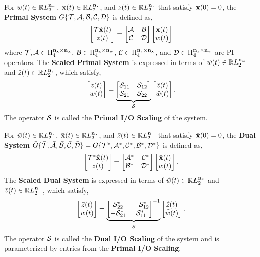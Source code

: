 
\begin{definition}\label{def:primalscaledsys}
	For $w(t)\in\mathbb{R} L_2^{\mathbf{n}_w}$, $\mathbf{x}(t)\in\mathbb{R} L_2^{\mathbf{n}_{\mathbf{x}}}$, and
	$z(t)\in\mathbb{R} L_2^{\mathbf{n}_z}$ that satisfy $\mathbf{x}(0) = 0$, the \textbf{Primal System}
	$G\{\mathcal{T}, \mathcal{A}, \mathcal{B}, \mathcal{C}, \mathcal{D}\}$ is defined as,
	\begin{equation}\label{eqn:primalsys}
		\begin{bmatrix}\mathcal{T}\dot{\mathbf{x}}(t)\\ z(t)\end{bmatrix} = \begin{bmatrix}\mathcal{A} & \mathcal{B} \\
			\mathcal{C} & \mathcal{D}\end{bmatrix}\begin{bmatrix}\mathbf{x}(t) \\ w(t)\end{bmatrix}
	\end{equation}
	where $\mathcal{T}, \mathcal{A}\in \Pi_4^{\mathbf{n}_{\mathbf{x}} \times \mathbf{n}_{\mathbf{x}}}$,
	$\mathcal{B}\in \Pi_4^{\mathbf{n}_{\mathbf{x}} \times \mathbf{n}_w}$,
	$\mathcal{C}\in\Pi_4^{\mathbf{n}_z\times\mathbf{n}_{\mathbf{x}}}$, and
	$\mathcal{D}\in\Pi_4^{\mathbf{n}_z \times \mathbf{n}_w}$ are PI operators.
	The \textbf{Scaled Primal System} is expressed in terms of $\tilde{w}(t)\in
		\mathbb{R} L_2^{\mathbf{n}_w}$ and $\tilde{z}(t)\in\mathbb{R} L_2^{\mathbf{n}_z}$, which satisfy,
	\begin{equation}\label{eqn:primalscaling}
		\begin{bmatrix}z(t) \\ w(t)\end{bmatrix} = \underbrace{\begin{bmatrix}\mathcal{S}_{11} & \mathcal{S}_{12} \\
				\mathcal{S}_{21} & \mathcal{S}_{22}\end{bmatrix}}_{\mathcal{S}}\begin{bmatrix}\tilde{z}(t) \\ \tilde{w}(t)\end{bmatrix}.
	\end{equation}
	The operator $\mathcal{S}$ is called the \textbf{Primal I/O Scaling} of the system.
\end{definition}

\begin{definition}\label{def:dualscaledsys}
	For $\bar{w}(t)\in\mathbb{R} L_2^{\mathbf{n}_z}$, $\bar{\mathbf{x}}(t)\in\mathbb{R} L_2^{\mathbf{n}_{\mathbf{x}}}$, and
	$\bar{z}(t)\in\mathbb{R} L_2^{\mathbf{n}_w}$ that satisfy $\bar{\mathbf{x}}(0) = 0$, the \textbf{Dual
		System} $\bar{G}\{\bar{\mathcal{T}}, \bar{\mathcal{A}}, \bar{\mathcal{B}}, \bar{\mathcal{C}},
		\bar{\mathcal{D}}\} = G\{\mathcal{T}^*, \mathcal{A}^*, \mathcal{C}^*, \mathcal{B}^*, \mathcal{D}^*\}$ is
	defined as,
	\begin{equation}\label{eqn:dualsys}
		\begin{bmatrix}\mathcal{T}^*\dot{\bar{\mathbf{x}}}(t)\\ \bar{z}(t)\end{bmatrix} = \begin{bmatrix}\mathcal{A}^* &
			\mathcal{C}^* \\ \mathcal{B}^* & \mathcal{D}^*\end{bmatrix}\begin{bmatrix}\bar{\mathbf{x}}(t) \\ \bar{w}(t)\end{bmatrix}.
	\end{equation}
	The \textbf{Scaled Dual System} is expressed in terms of $\tilde{\bar{w}}(t)\in
		\mathbb{R} L_2^{\mathbf{n}_z}$ and $\tilde{\bar{z}}(t)\in\mathbb{R} L_2^{\mathbf{n}_w}$, which satisfy,
	\begin{equation}\label{eqn:dualscaling}
		\begin{bmatrix}\bar{z}(t) \\ \bar{w}(t)\end{bmatrix} = \underbrace{\begin{bmatrix}\mathcal{S}_{22}^* &
				-\mathcal{S}^*_{12} \\ -\mathcal{S}^*_{21} & \mathcal{S}^*_{11}\end{bmatrix}^{-1}}_{\bar{\mathcal{S}}}
		\begin{bmatrix}\tilde{\bar{z}}(t) \\ \tilde{\bar{w}}(t)\end{bmatrix}.
	\end{equation}
	The operator $\bar{\mathcal{S}}$ is called the \textbf{Dual I/O Scaling} of the system
	and is parameterized by entries from the \textbf{Primal I/O Scaling}.
\end{definition}

